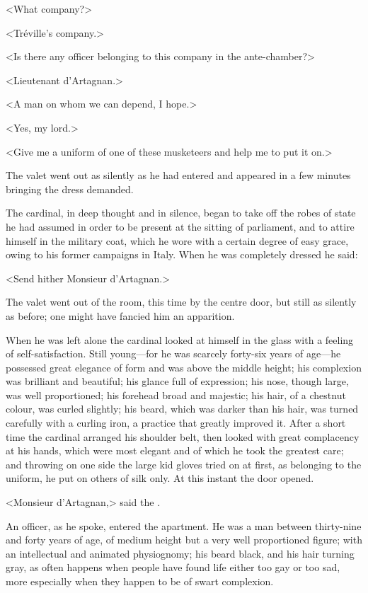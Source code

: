 <What company?>

<Tréville's company.>

<Is there any officer belonging to this company in the ante-chamber?>

<Lieutenant d'Artagnan.>

<A man on whom we can depend, I hope.>

<Yes, my lord.>

<Give me a uniform of one of these musketeers and help me to put it on.>

The valet went out as silently as he had entered and appeared in a few minutes bringing the dress demanded.

The cardinal, in deep thought and in silence, began to take off the robes of state he had assumed in order to be present at the sitting of parliament, and to attire himself in the military coat, which he wore with a certain degree of easy grace, owing to his former campaigns in Italy. When he was completely dressed he said:

<Send hither Monsieur d'Artagnan.>

The valet went out of the room, this time by the centre door, but still as silently as before; one might have fancied him an apparition.

When he was left alone the cardinal looked at himself in the glass with a feeling of self-satisfaction. Still young—for he was scarcely forty-six years of age—he possessed great elegance of form and was above the middle height; his complexion was brilliant and beautiful; his glance full of expression; his nose, though large, was well proportioned; his forehead broad and majestic; his hair, of a chestnut colour, was curled slightly; his beard, which was darker than his hair, was turned carefully with a curling iron, a practice that greatly improved it. After a short time the cardinal arranged his shoulder belt, then looked with great complacency at his hands, which were most elegant and of which he took the greatest care; and throwing on one side the large kid gloves tried on at first, as belonging to the uniform, he put on others of silk only. At this instant the door opened.

<Monsieur d'Artagnan,> said the .

An officer, as he spoke, entered the apartment. He was a man between thirty-nine and forty years of age, of medium height but a very well proportioned figure; with an intellectual and animated physiognomy; his beard black, and his hair turning gray, as often happens when people have found life either too gay or too sad, more especially when they happen to be of swart complexion.

